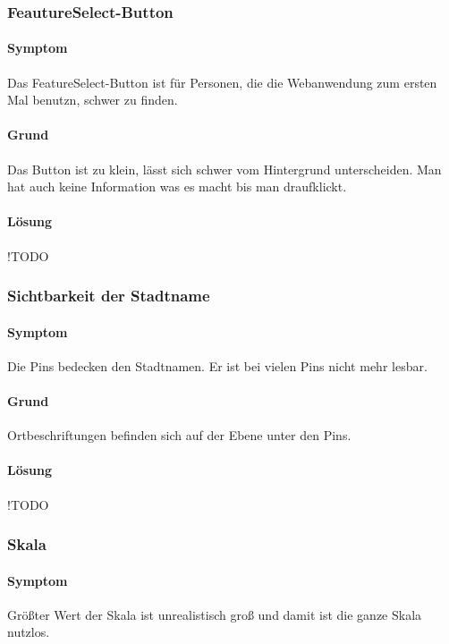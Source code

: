 \subsubsection{FeautureSelect-Button}
\paragraph{Symptom}
Das FeatureSelect-Button ist für Personen, die die Webanwendung zum ersten Mal benutzn, schwer zu finden.  

\paragraph{Grund}
Das Button ist zu klein, lässt sich schwer vom Hintergrund unterscheiden. Man hat auch keine Information was es macht bis man draufklickt.

\paragraph{Lösung}
!TODO

\subsubsection{Sichtbarkeit der Stadtname}
\paragraph{Symptom}
Die Pins bedecken den Stadtnamen. Er ist bei vielen Pins nicht mehr lesbar.

\paragraph{Grund}
Ortbeschriftungen befinden sich auf der Ebene unter den Pins. 

\paragraph{Lösung}
!TODO

\subsubsection{Skala}
\paragraph{Symptom}
Größter Wert der Skala ist unrealistisch groß und damit ist die ganze Skala nutzlos.

